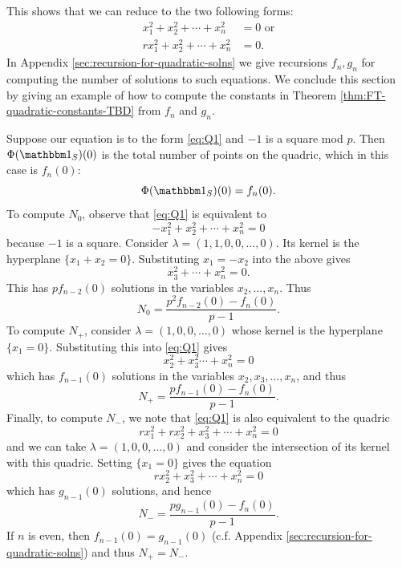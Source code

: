 This shows that we can reduce to the two following forms:
\begin{align}
x_1^2 + x_2^2 + \cdots + x_n^2 &= 0\text{ or} \tag{Q1}\label{eq:Q1}\\ 
rx_1^2 + x_2^2 + \cdots + x_n^2 &= 0. \tag{Q2}\label{eq:Q2}
\end{align}
In Appendix \ref{sec:recursion-for-quadratic-solns} we give recursions $f_n, g_n$ for computing the number of solutions to such equations. We conclude this section by giving an example of how to compute the constants in Theorem \ref{thm:FT-quadratic-constants-TBD} from $f_n$ and $g_n$.

\begin{example}
	Suppose our equation is to the form \eqref{eq:Q1} and $-1$ is a square mod $p$. Then $\Phi(\IND_S)(0)$ is the total number of points on the quadric, which in this case is $f_n (0)$:
	\[
		\Phi(\IND_S)(0) = f_n(0).
	\]
	To compute $N_0$, observe that \eqref{eq:Q1} is equivalent to
	\[
		-x_1^2 + x_2^2 + \cdots + x_n^2 = 0
	\]
	because $-1$ is a square. Consider $\lambda = (1,1,0,0,\ldots,0)$. Its kernel is the hyperplane $\{x_1 + x_2 = 0\}$. Substituting $x_1 = -x_2$ into the above gives
	\[
	x_3^2 + \cdots + x_n^2 = 0.
	\]
	This has $p f_{n-2}(0)$ solutions in the variables $x_2,\ldots,x_n$. Thus
	\[
	N_0 = \frac{p^2 f_{n-2}(0) - f_n(0)}{p-1}.
	\]
	To compute $N_+$, consider $\lambda = (1,0,0,\ldots,0)$ whose kernel is the hyperplane $\{x_1 = 0\}$. Substituting this into \eqref{eq:Q1} gives
	\[
	x_2^2 + x_3^2 \cdots + x_n^2 = 0
	\]
	which has $f_{n-1}(0)$ solutions in the variables $x_2,x_3,\ldots,x_n$, and thus
	\[
	N_+ = \frac{p f_{n-1}(0) - f_n(0)}{p-1}.
	\]
	Finally, to compute $N_-$, we note that \eqref{eq:Q1} is also equivalent to the quadric
	\[
		rx_1^2 + rx_2^2 + x_3^2 + \cdots + x_n^2 = 0
	\]
	and we can take $\lambda = (1,0,0,\ldots,0)$ and consider the intersection of its kernel with this quadric. Setting $\{x_1 = 0\}$ gives the equation
	\[
		rx_2^2 + x_3^2 + \cdots + x_n^2 = 0
	\]
	which has $g_{n-1}(0)$ solutions, and hence
	\[
		N_- = \frac{pg_{n-1}(0) - f_n(0)}{p-1}.
	\]
	If $n$ is even, then $f_{n-1}(0) = g_{n-1}(0)$ (c.f. Appendix \ref{sec:recursion-for-quadratic-solns}) and thus $N_+ = N_-$.
\end{example}